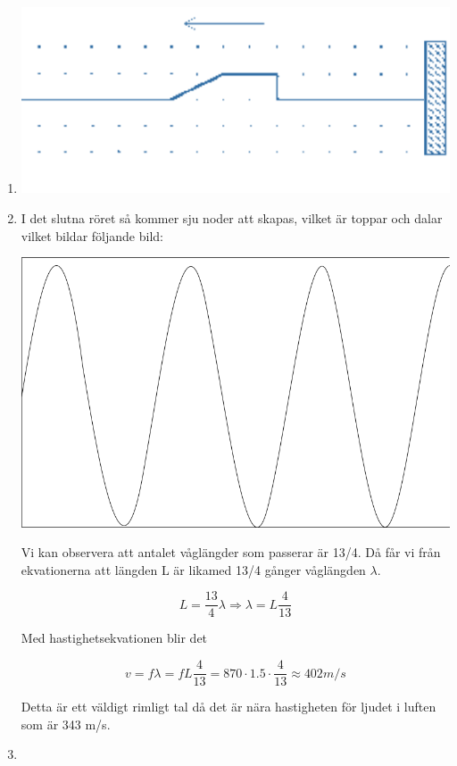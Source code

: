 \documentclass[a4paper,12pt]{article}
\begin{document}
\begin{enumerate}
    \item \includegraphics{Figur 1.png}
    
    \item 
    I det slutna röret så kommer sju noder att skapas,
    vilket är toppar och dalar vilket bildar följande bild:
    \begin{center}
        \includegraphics[scale=0.5]{Figur 2.png}
    \end{center}

    Vi kan observera att antalet våglängder som passerar
    är 13/4. Då får vi från ekvationerna att längden L är 
    likamed 13/4 gånger våglängden $\lambda$.

    $$L=\frac{13}{4}\lambda \Rightarrow \lambda=L\frac{4}{13}$$

    Med hastighetsekvationen blir det 

    $$v=f\lambda=fL\frac{4}{13}=870\cdot 1.5\cdot \frac{4}{13}\approx 402m/s$$

    Detta är ett väldigt rimligt tal då det är nära hastigheten 
    för ljudet i luften som är 343 m/s.
    
    \item 
\end{enumerate}
\end{document}
